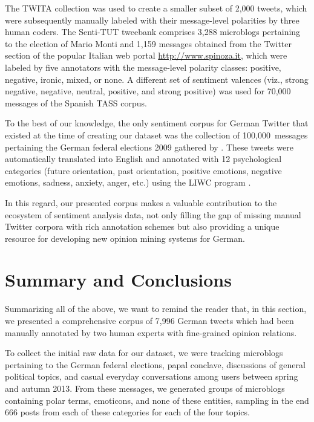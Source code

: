 The TWITA collection was used to create a smaller subset of 2,000
tweets, which were subsequently manually labeled with their
message-level polarities by three human coders.  The Senti-TUT
tweebank comprises 3,288 microblogs pertaining to the election of
Mario Monti and 1,159 messages obtained from the Twitter section of
the popular Italian web portal \url{http://www.spinoza.it}, which were
labeled by five annotators with the message-level polarity classes:
positive, negative, ironic, mixed, or none.  A different set of
sentiment valences (viz., strong negative, negative, neutral,
positive, and strong positive) was used for 70,000 messages of the
Spanish TASS corpus.

To the best of our knowledge, the only sentiment corpus for German
Twitter that existed at the time of creating our dataset was the
collection of 100,000~messages pertaining the German federal elections
2009 gathered by \citet{Tumasjan:10}.  These tweets were automatically
translated into English and annotated with 12 psychological categories
(future orientation, past orientation, positive emotions, negative
emotions, sadness, anxiety, anger, etc.) using the LIWC program
\cite[Linguistic Inquiry and Word Count;][]{Pannebaker:07}.

In this regard, our presented corpus makes a valuable contribution to
the ecosystem of sentiment analysis data, not only filling the gap of
missing manual Twitter corpora with rich annotation schemes but also
providing a unique resource for developing new opinion mining systems
for German.  %

\section{Summary and Conclusions}
Summarizing all of the above, we want to remind the reader that, in
this section, we presented a comprehensive corpus of 7,996 German
tweets which had been manually annotated by two human experts with
fine-grained opinion relations.

To collect the initial raw data for our dataset, we were tracking
microblogs pertaining to the German federal elections, papal conclave,
discussions of general political topics, and casual everyday
conversations among users between spring and autumn 2013.  From these
messages, we generated groups of microblogs containing polar terms,
emoticons, and none of these entities, sampling in the end 666 posts
from each of these categories for each of the four topics.

